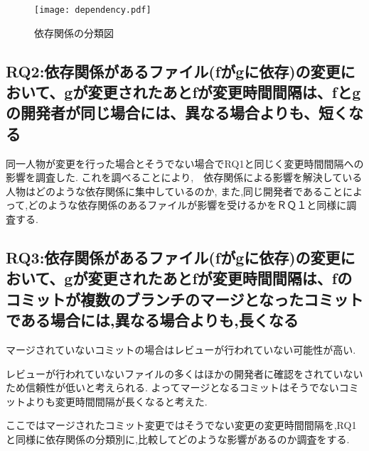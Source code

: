 \documentclass{fose2016}           %
\begin{document}
\begin{figure}[t]
\centering
\texttt{[image: dependency.pdf]}
\caption{依存関係の分類図}
\label{fig:dependency} 
\end{figure}

\subsection{RQ2:依存関係があるファイル(fがgに依存)の変更において、gが変更されたあとfが変更時間間隔は、fとgの開発者が同じ場合には、異なる場合よりも、短くなる}
同一人物が変更を行った場合とそうでない場合でRQ1と同じく変更時間間隔への影響を調査した.
これを調べることにより,　依存関係による影響を解決している人物はどのような依存関係に集中しているのか,
また,同じ開発者であることによって,どのような依存関係のあるファイルが影響を受けるかをＲＱ１と同様に調査する.

\subsection{RQ3:依存関係があるファイル(fがgに依存)の変更において、gが変更されたあとfが変更時間間隔は、fのコミットが複数のブランチのマージとなったコミットである場合には,異なる場合よりも,長くなる}
マージされていないコミットの場合はレビューが行われていない可能性が高い.

レビューが行われていないファイルの多くはほかの開発者に確認をされていないため信頼性が低いと考えられる.
よってマージとなるコミットはそうでないコミットよりも変更時間間隔が長くなると考えた.

ここではマージされたコミット変更ではそうでない変更の変更時間間隔を,RQ1と同様に依存関係の分類別に,比較してどのような影響があるのか調査をする.

\end{document}
